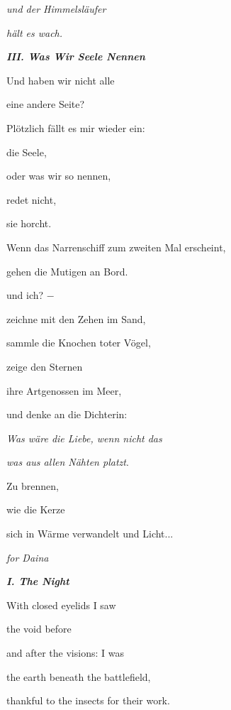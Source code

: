 \emph{
und der Himmelsläufer}

\emph{
hält es wach.}


\bigskip

{\bfseries\itshape
III. Was Wir Seele Nennen}


\bigskip

Und haben wir nicht alle

eine andere Seite?


\bigskip

Plötzlich fällt es mir wieder ein:

die Seele,

oder was wir so nennen,

redet nicht,

sie horcht.


\bigskip

Wenn das Narrenschiff zum zweiten Mal erscheint,

gehen die Mutigen an Bord. 

und ich? $-$


\bigskip

zeichne mit den Zehen im Sand,

sammle die Knochen toter Vögel,

zeige den Sternen 

ihre Artgenossen im Meer,


\bigskip

und denke an die Dichterin:

\emph{
Was wäre die Liebe, wenn nicht das}

\emph{was aus allen Nähten platzt}.


\bigskip

Zu brennen,

wie die Kerze

sich in Wärme verwandelt und Licht...


\bigskip


\bigskip


\emph{
for Daina}


\bigskip

{\bfseries\itshape
I. The Night}


\bigskip

With closed eyelids I saw

the void before

and after the visions: I was

the earth beneath the battlefield,

thankful to the insects for their work.


